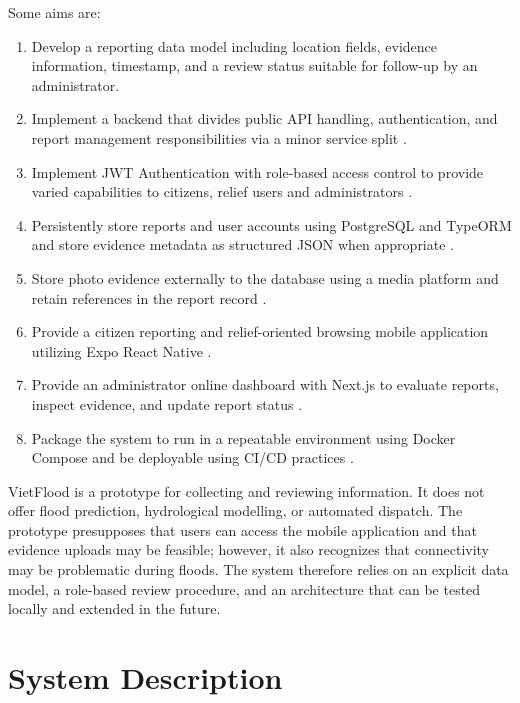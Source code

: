 Some aims are:
\begin{enumerate}
    \item Develop a reporting data model including location fields, evidence information, timestamp, and a review status suitable for follow-up by an administrator.
    \item Implement a backend that divides public API handling, authentication, and report management responsibilities via a minor service split \cite{fowlerLewis2014microservices,dragoni2017microservices,thones2015microservices}.
    \item Implement JWT Authentication with role-based access control to provide varied capabilities to citizens, relief users and administrators \cite{jones2015jwt}.
    \item Persistently store reports and user accounts using PostgreSQL and TypeORM and store evidence metadata as structured JSON when appropriate \cite{typeormDocs,postgresqlJsonDocs}.
    \item Store photo evidence externally to the database using a media platform and retain references in the report record \cite{cloudinaryUploadDocs}.
    \item Provide a citizen reporting and relief-oriented browsing mobile application utilizing Expo React Native \cite{expoDocs,reactNativeDocs}.
    \item Provide an administrator online dashboard with Next.js to evaluate reports, inspect evidence, and update report status \cite{nextjsDocs}.
    \item Package the system to run in a repeatable environment using Docker Compose and be deployable using CI/CD practices \cite{dockerComposeDocs, githubActionsDocs, azureAppServiceContainersDocs, humble2010continuousDelivery, kim2016devopsHandbook}.
\end{enumerate}

VietFlood is a prototype for collecting and reviewing information. It does not offer flood prediction, hydrological modelling, or automated dispatch. The prototype presupposes that users can access the mobile application and that evidence uploads may be feasible; however, it also recognizes that connectivity may be problematic during floods. The system therefore relies on an explicit data model, a role-based review procedure, and an architecture that can be tested locally and extended in the future.

\section{System Description}

